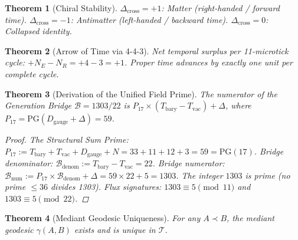 \documentclass[11pt, letterpaper]{article}
\newcommand{\Dcross}{\Delta_{\mathrm{cross}}}
\newcommand{\Tbary}{T_{\mathrm{bary}}}
\newcommand{\Dg}{D_{\mathrm{gauge}}}
\newcommand{\Bridge}{\mathcal{B}}
\newcommand{\PG}{\mathrm{PG}}
\theoremstyle{definition}
\theoremstyle{plain}
\newtheorem{theorem}{Theorem}[section]
\begin{document}
\begin{theorem}[Chiral Stability]\label{thm:chiral}
$\Dcross=+1$: Matter (right-handed / forward time).
$\Dcross=-1$: Antimatter (left-handed / backward time).
$\Dcross=0$: Collapsed identity.
\end{theorem}

\begin{theorem}[Arrow of Time via 4-4-3]\label{thm:arrow-443}
Net temporal surplus per 11-microtick cycle: $+N_E-N_R=+4-3=+1$.  Proper
time advances by exactly one unit per complete cycle.
\end{theorem}

\begin{theorem}[Derivation of the Unified Field Prime]\label{thm:bridge}
The numerator of the Generation Bridge $\Bridge=1303/22$ is
$P_{17}\times(\Tbary-T_{\mathrm{vac}})+\Delta$, where $P_{17}=\PG(\Dg+\Delta)=59$.
\begin{proof}
The Structural Sum Prime: $P_{17}:=\Tbary+T_{\mathrm{vac}}+\Dg+N
=33+11+12+3=59=\PG(17)$.  Bridge denominator:
$\Bridge_{\mathrm{denom}}:=\Tbary-T_{\mathrm{vac}}=22$.
Bridge numerator:
$\Bridge_{\mathrm{num}}:=P_{17}\times\Bridge_{\mathrm{denom}}+\Delta
=59\times 22+5=1303$.  The integer $1303$ is prime
(no prime $\leq 36$ divides 1303).  Flux signatures:
$1303\equiv 5\pmod{11}$ and $1303\equiv 5\pmod{22}$.
\end{proof}
\end{theorem}

\begin{theorem}[Mediant Geodesic Uniqueness]\label{thm:geodesic-unique}
For any $A\prec B$, the mediant geodesic $\gamma(A,B)$ exists and is unique
in $\mathcal{T}$.
\end{theorem}
\end{document}

